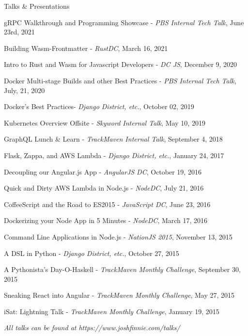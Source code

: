 \documentclass{bluefin_cv}
\begin{document}
\begin{bfcvSection}{Talks \& Presentations}
\begin{bfcvListSubsection}
\item gRPC Walkthrough and Programming Showcase - \textsl{PBS Internal Tech Talk}, June 23rd, 2021
\item Building Wasm-Frontmatter - \textsl{RustDC}, March 16, 2021
\item Intro to Rust and Wasm for Javascript Developers - \textsl{DC JS}, December 9, 2020
\item Docker Multi-stage Builds and other Best Practices - \textsl{PBS Internal Tech Talk}, July, 21, 2020
\item Docker's Best Practices- \textsl{Django District, etc.}, October 02, 2019
\item Kubernetes Overview Offsite - \textsl{Skyword Internal Talk}, May 10, 2019
\item GraphQL Lunch \& Learn - \textsl{TrackMaven Internal Talk}, September 4, 2018
\item Flask, Zappa, and AWS Lambda - \textsl{Django District, etc.}, January 24, 2017
\item Decoupling our Angular.js App - \textsl{AngularJS DC}, October 19, 2016
\item Quick and Dirty AWS Lambda in Node.js - \textsl{NodeDC}, July 21, 2016
\item CoffeeScript and the Road to ES2015 - \textsl{JavaScript DC}, June 23, 2016
\item Dockerizing your Node App in 5 Minutes - \textsl{NodeDC}, March 17, 2016
\item Command Line Applications in Node.js - \textsl{NationJS 2015}, November 13, 2015
\item A DSL in Python - \textsl{Django District, etc.}, October 27, 2015
\item A Pythonista's Day-O-Haskell -  \textsl{TrackMaven Monthly Challenge}, September 30, 2015
\item Sneaking React into Angular -  \textsl{TrackMaven Monthly Challenge}, May 27, 2015
\item iSat: Lightning Talk -  \textsl{TrackMaven Monthly Challenge}, January 19, 2015
\end{bfcvListSubsection}
\smallskip
\centerline{\textsl{All talks can be found at https://www.joshfinnie.com/talks/}}
\end{bfcvSection}
\end{document}
